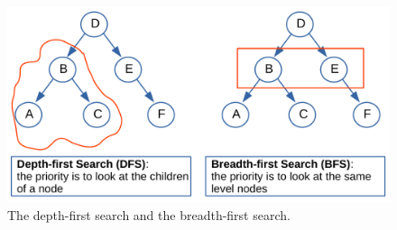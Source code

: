 \begin{figure}[H]
	\begin{center}
		\includegraphics[scale=.6]{chapters/trees/images/trees_4.pdf}
		\caption[The depth-first search and the breadth-first search.]{The depth-first search and the breadth-first search.}
		\label{trees_4}
	\end{center}
\end{figure}


